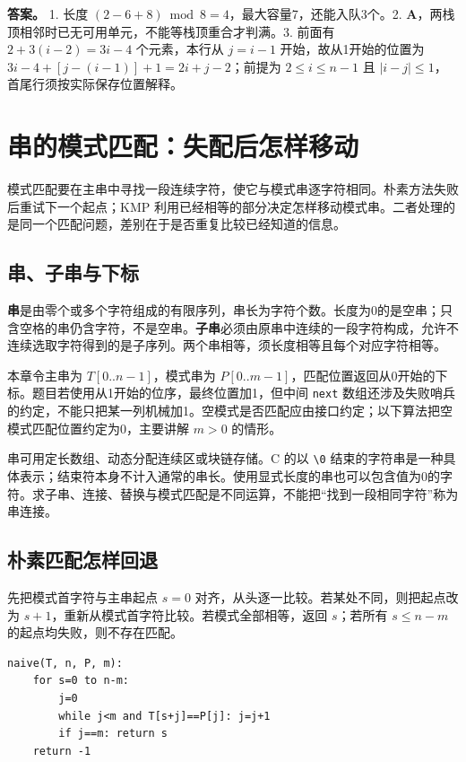 \textbf{答案。} 1. 长度 \((2-6+8)\bmod8=4\)，最大容量7，还能入队3个。2. \textbf{A}，两栈顶相邻时已无可用单元，不能等栈顶重合才判满。3. 前面有 \(2+3(i-2)=3i-4\) 个元素，本行从 \(j=i-1\) 开始，故从1开始的位置为 \(3i-4+[j-(i-1)]+1=2i+j-2\)；前提为 \(2\le i\le n-1\) 且 \(|i-j|\le1\)，首尾行须按实际保存位置解释。

\chapter{串的模式匹配：失配后怎样移动}\label{ds-ch4}

模式匹配要在主串中寻找一段连续字符，使它与模式串逐字符相同。朴素方法失败后重试下一个起点；KMP 利用已经相等的部分决定怎样移动模式串。二者处理的是同一个匹配问题，差别在于是否重复比较已经知道的信息。

\section{串、子串与下标}\label{ds-04-01}

\textbf{串}是由零个或多个字符组成的有限序列，串长为字符个数。长度为0的是空串；只含空格的串仍含字符，不是空串。\textbf{子串}必须由原串中连续的一段字符构成，允许不连续选取字符得到的是子序列。两个串相等，须长度相等且每个对应字符相等。

本章令主串为 \(T[0..n-1]\)，模式串为 \(P[0..m-1]\)，匹配位置返回从0开始的下标。题目若使用从1开始的位序，最终位置加1，但中间 \allowbreak{}\texttt{next} 数组还涉及失败哨兵的约定，不能只把某一列机械加1。空模式是否匹配应由接口约定；以下算法把空模式匹配位置约定为0，主要讲解 \(m>0\) 的情形。

串可用定长数组、动态分配连续区或块链存储。C 的以 \allowbreak{}\texttt{\textbackslash{}0} 结束的字符串是一种具体表示；结束符本身不计入通常的串长。使用显式长度的串也可以包含值为0的字符。求子串、连接、替换与模式匹配是不同运算，不能把``找到一段相同字符''称为串连接。

\section{朴素匹配怎样回退}\label{ds-04-02}

先把模式首字符与主串起点 \(s=0\) 对齐，从头逐一比较。若某处不同，则把起点改为 \(s+1\)，重新从模式首字符比较。若模式全部相等，返回 \(s\)；若所有 \(s\le n-m\) 的起点均失败，则不存在匹配。

\par\medskip\noindent
\begin{minipage}{\linewidth}
\begin{verbatim}
naive(T, n, P, m):
    for s=0 to n-m:
        j=0
        while j<m and T[s+j]==P[j]: j=j+1
        if j==m: return s
    return -1
\end{verbatim}
\end{minipage}\par\medskip

